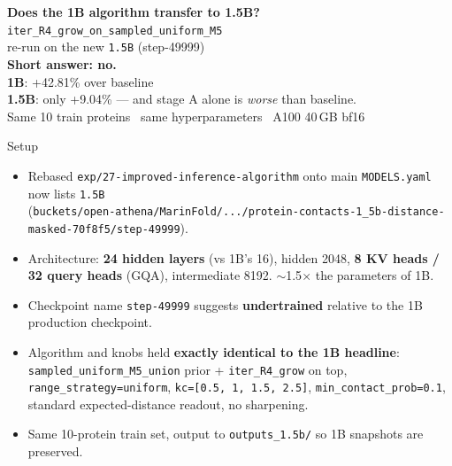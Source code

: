 \documentclass[aspectratio=169,11pt]{beamer}
\newcommand{\code}[1]{\texttt{\small\color{navy}#1}}
\newcommand{\codeS}[1]{\texttt{\scriptsize\color{navy}#1}}
\begin{document}
\begin{frame}[plain]
  \begin{center}
    \vspace{0.6cm}
    {\Huge\bfseries\color{navy}Does the 1B algorithm transfer to 1.5B?}\\[0.4cm]
    {\Large\color{navy}\codeS{iter\_R4\_grow\_on\_sampled\_uniform\_M5}}\\
    {\Large\color{navy}re-run on the new \codeS{1.5B} (step-49999)}\\[0.7cm]
    {\Large\color{red}\bfseries Short answer: no.}\\[0.4cm]
    {\large\color{navy}\textbf{1B}: +42.81\% over baseline\\[0.2em]
     \textbf{1.5B}: only +9.04\% — and stage A alone is \emph{worse} than baseline.}\\[1.2cm]
    {\small\color{grey}\ttfamily Same 10 train proteins \textperiodcentered\
      same hyperparameters \textperiodcentered\ A100 40\,GB bf16}
  \end{center}
\end{frame}

\begin{frame}{Setup}
  \begin{itemize}
    \setlength\itemsep{0.4em}
    \item Rebased \code{exp/27-improved-inference-algorithm} onto main \textrightarrow{}
          \code{MODELS.yaml} now lists \code{1.5B}\\
          (\codeS{buckets/open-athena/MarinFold/.../protein-contacts-1\_5b-distance-masked-70f8f5/step-49999}).
    \item Architecture: \textbf{24 hidden layers} (vs 1B's 16), hidden 2048,
          \textbf{8 KV heads / 32 query heads} (GQA), intermediate 8192.
          $\sim$1.5$\times$ the parameters of 1B.
    \item Checkpoint name \codeS{step-49999} suggests \textbf{undertrained}
          relative to the 1B production checkpoint.
    \item Algorithm and knobs held \textbf{exactly identical to the 1B
          headline}: \code{sampled\_uniform\_M5\_union} prior + \code{iter\_R4\_grow}
          on top, \code{range\_strategy=uniform},
          \code{kc=[0.5, 1, 1.5, 2.5]}, \code{min\_contact\_prob=0.1},
          standard expected-distance readout, no sharpening.
    \item Same 10-protein train set, output to \codeS{outputs\_1.5b/} so 1B
          snapshots are preserved.
  \end{itemize}
\end{frame}
\end{document}
